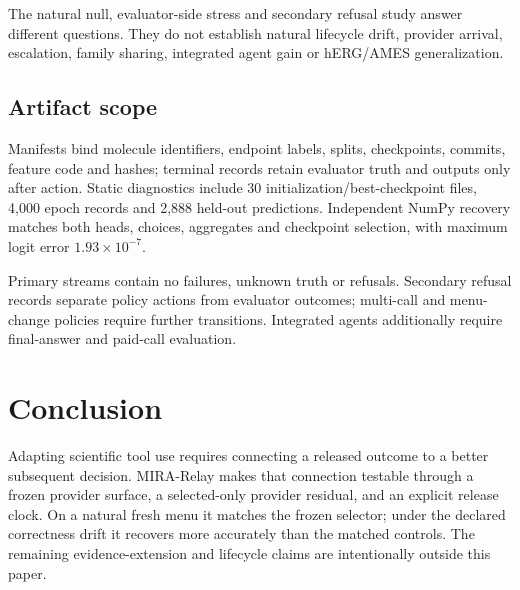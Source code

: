 \documentclass[sigconf,anonymous]{aamas}
\begin{document}
The natural null, evaluator-side stress and secondary refusal study answer different questions. They do not establish natural lifecycle drift, provider arrival, escalation, family sharing, integrated agent gain or hERG/AMES generalization.

\subsection{Artifact scope}
Manifests bind molecule identifiers, endpoint labels, splits, checkpoints, commits, feature code and hashes; terminal records retain evaluator truth and outputs only after action. Static diagnostics include 30 initialization/best-checkpoint files, 4,000 epoch records and 2,888 held-out predictions. Independent NumPy recovery matches both heads, choices, aggregates and checkpoint selection, with maximum logit error $1.93\times10^{-7}$.

Primary streams contain no failures, unknown truth or refusals. Secondary refusal records separate policy actions from evaluator outcomes; multi-call and menu-change policies require further transitions. Integrated agents additionally require final-answer and paid-call evaluation.

\section{Conclusion}
Adapting scientific tool use requires connecting a released outcome to a better subsequent decision. MIRA-Relay makes that connection testable through a frozen provider surface, a selected-only provider residual, and an explicit release clock. On a natural fresh menu it matches the frozen selector; under the declared correctness drift it recovers more accurately than the matched controls. The remaining evidence-extension and lifecycle claims are intentionally outside this paper.

\clearpage
\balance


\end{document}
